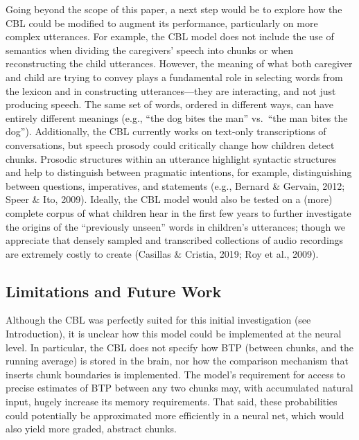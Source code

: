 \documentclass[
  english,
  man,floatsintext]{apa6}
\begin{document}
Going beyond the scope of this paper, a next step would be to explore how the CBL could be modified to augment its performance, particularly on more complex utterances. For example, the CBL model does not include the use of semantics when dividing the caregivers' speech into chunks or when reconstructing the child utterances. However, the meaning of what both caregiver and child are trying to convey plays a fundamental role in selecting words from the lexicon and in constructing utterances---they are interacting, and not just producing speech. The same set of words, ordered in different ways, can have entirely different meanings (e.g., \enquote{the dog bites the man} vs.~\enquote{the man bites the dog}). Additionally, the CBL currently works on text-only transcriptions of conversations, but speech prosody could critically change how children detect chunks. Prosodic structures within an utterance highlight syntactic structures and help to distinguish between pragmatic intentions, for example, distinguishing between questions, imperatives, and statements (e.g., Bernard \& Gervain, 2012; Speer \& Ito, 2009). Ideally, the CBL model would also be tested on a (more) complete corpus of what children hear in the first few years to further investigate the origins of the \enquote{previously unseen} words in children's utterances; though we appreciate that densely sampled and transcribed collections of audio recordings are extremely costly to create (Casillas \& Cristia, 2019; Roy et al., 2009).

\hypertarget{limitations-and-future-work}{%
\subsection{Limitations and Future Work}\label{limitations-and-future-work}}

Although the CBL was perfectly suited for this initial investigation (see Introduction), it is unclear how this model could be implemented at the neural level. In particular, the CBL does not specify how BTP (between chunks, and the running average) is stored in the brain, nor how the comparison mechanism that inserts chunk boundaries is implemented. The model's requirement for access to precise estimates of BTP between any two chunks may, with accumulated natural input, hugely increase its memory requirements. That said, these probabilities could potentially be approximated more efficiently in a neural net, which would also yield more graded, abstract chunks.
\end{document}

